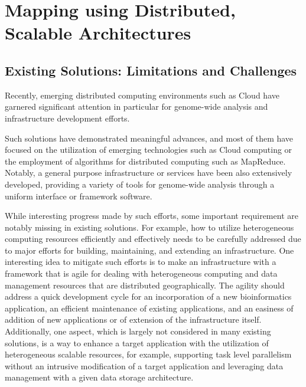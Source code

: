 \documentclass{acm_proc_article-sp}
\begin{document}
\section{Mapping using Distributed, Scalable Architectures}

\subsection{Existing Solutions: Limitations and Challenges}


Recently, emerging distributed computing environments such as Cloud have garnered significant attention in particular for genome-wide analysis and infrastructure development efforts\cite{taylor2010,cloudburst,
  cloudblast, langmead2009, langmead2010,gatk, halligan2009}. 


Such solutions have demonstrated meaningful advances, and most of them have focused on the utilization of emerging technologies such as Cloud computing or the employment of algorithms for distributed computing such as MapReduce.  Notably, a general purpose infrastructure or services have been also extensively developed, providing a variety of tools for genome-wide analysis through a uniform interface or framework software\cite{galaxy}. 

While interesting progress made by such efforts, some important requirement are notably missing in existing solutions. For example,
how to utilize heterogeneous computing resources efficiently and effectively needs to be carefully addressed due to major efforts for building, maintaining, and extending an infrastructure.  One interesting idea to mitigate such efforts is to make an infrastructure with a framework that is agile for dealing with heterogeneous computing and data management resources that are distributed geographically.  The agility should address a quick development cycle for an incorporation of a new bioinformatics application, an efficient maintenance of existing applications, and an easiness of addition of new applications or of extension of the infrastructure itself.  Additionally, one aspect, which is largely not considered in many existing solutions, is a way to enhance a target application with the utilization of heterogeneous scalable resources, for example, supporting task level parallelism without an intrusive modification of a target application and leveraging data management with a given data storage architecture.
\end{document}
